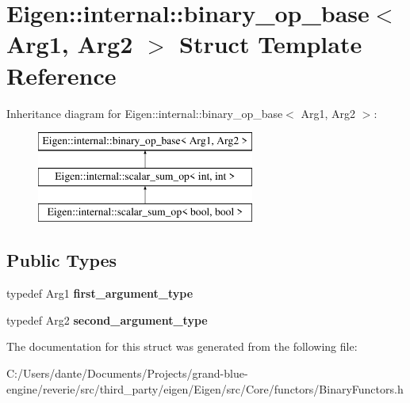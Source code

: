 \hypertarget{struct_eigen_1_1internal_1_1binary__op__base}{}\section{Eigen\+::internal\+::binary\+\_\+op\+\_\+base$<$ Arg1, Arg2 $>$ Struct Template Reference}
\label{struct_eigen_1_1internal_1_1binary__op__base}
Inheritance diagram for Eigen\+::internal\+::binary\+\_\+op\+\_\+base$<$ Arg1, Arg2 $>$\+:\begin{figure}[H]
\begin{center}
\leavevmode
\includegraphics[height=3.000000cm]{struct_eigen_1_1internal_1_1binary__op__base}
\end{center}
\end{figure}
\subsection*{Public Types}
\begin{DoxyCompactItemize}
\item 
\mbox{\label{struct_eigen_1_1internal_1_1binary__op__base_a83c1997b82c31cf8b003232445cbdcf2}} 
typedef Arg1 {\bfseries first\+\_\+argument\+\_\+type}
\item 
\mbox{\label{struct_eigen_1_1internal_1_1binary__op__base_abd943c603b3b6ff7c304ec1326b4eb53}} 
typedef Arg2 {\bfseries second\+\_\+argument\+\_\+type}
\end{DoxyCompactItemize}


The documentation for this struct was generated from the following file\+:\begin{DoxyCompactItemize}
\item 
C\+:/\+Users/dante/\+Documents/\+Projects/grand-\/blue-\/engine/reverie/src/third\+\_\+party/eigen/\+Eigen/src/\+Core/functors/Binary\+Functors.\+h\end{DoxyCompactItemize}
